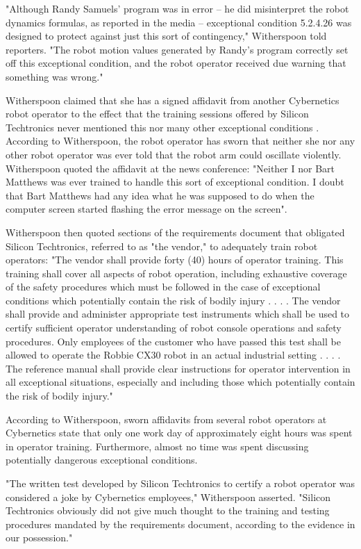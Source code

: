 "Although Randy Samuels' program was in error -- he did misinterpret the robot dynamics formulas, as reported in the media -- exceptional condition 5.2.4.26 was designed to protect against just this sort of contingency," Witherspoon told reporters. "The robot motion values generated by Randy's program correctly set off this exceptional condition, and the robot operator received due warning that something was wrong."

Witherspoon claimed that she has a signed affidavit from another Cybernetics robot operator to the effect that the training sessions offered by Silicon Techtronics never mentioned this nor many other exceptional conditions . According to Witherspoon, the robot operator has sworn that neither she nor any other robot operator was ever told that the robot arm could oscillate violently. Witherspoon quoted the affidavit at the news conference: "Neither I nor Bart Matthews was ever trained to handle this sort of exceptional condition. I doubt that Bart Matthews had any idea what he was supposed to do when the computer screen started flashing the error message on the screen".

Witherspoon then quoted sections of the requirements document that obligated Silicon Techtronics, referred to as "the vendor," to adequately train robot operators: "The vendor shall provide forty (40) hours of operator training. This training shall cover all aspects of robot operation, including exhaustive coverage of the safety procedures which must be followed in the case of exceptional conditions which potentially contain the risk of bodily injury . . . . The vendor shall provide and administer appropriate test instruments which shall be used to certify sufficient operator understanding of robot console operations and safety procedures. Only employees of the customer who have passed this test shall be allowed to operate the Robbie CX30 robot in an actual industrial setting . . . . The reference manual shall provide clear instructions for operator intervention in all exceptional situations, especially and including those which potentially contain the risk of bodily injury."

According to Witherspoon, sworn affidavits from several robot operators at Cybernetics state that only one work day of approximately eight hours was spent in operator training. Furthermore, almost no time was spent discussing potentially dangerous exceptional conditions.

"The written test developed by Silicon Techtronics to certify a robot operator was considered a joke by Cybernetics employees," Witherspoon asserted. "Silicon Techtronics obviously did not give much thought to the training and testing procedures mandated by the requirements document, according to the evidence in our possession."
